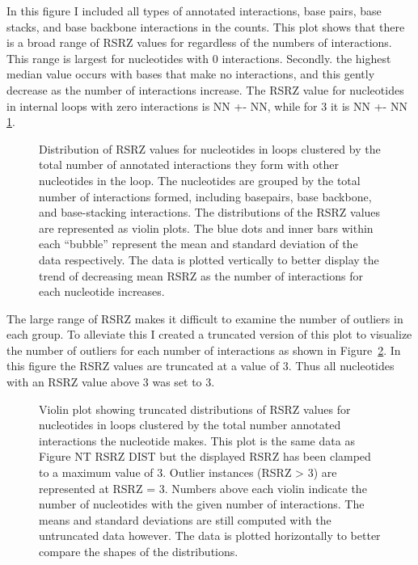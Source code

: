 In this figure I included all types of annotated interactions, base pairs, base
stacks, and base backbone interactions in the counts. This plot shows that there
is a broad range of RSRZ values for regardless of the numbers of interactions.
This range is largest for nucleotides with 0 interactions.  Secondly. the
highest median value occurs with bases that make no interactions, and this
gently decrease as the number of interactions increase. The RSRZ value for
nucleotides in internal loops with zero interactions is NN +- NN, while for 3 it
is NN +- NN \ref{tab:rsrz-means}.

\begin{figure}
  \caption{ Distribution of RSRZ values for nucleotides in loops clustered by
    the total number of annotated interactions they form with other nucleotides
    in the loop. The nucleotides are grouped by the total number of interactions
    formed, including basepairs, base backbone, and base-stacking interactions.
    The distributions of the RSRZ values are represented as violin plots. The
    blue dots and inner bars within each ``bubble'' represent the mean and
    standard deviation of the data respectively. The data is plotted vertically
    to better display the trend of decreasing mean RSRZ as the number of
  interactions for each nucleotide increases. }
  \label{tab:rsrz-means}
\end{figure}

The large range of RSRZ makes it difficult to examine the number of outliers in
each group. To alleviate this I created a truncated version of this plot to
visualize the number of outliers for each number of interactions as shown in
Figure~\ref{fig:truncated-rsrz-dist}. In this figure the RSRZ values are
truncated at a value of 3. Thus all nucleotides with an RSRZ value above 3 was
set to 3. 

\begin{figure}
  \caption{Violin plot showing truncated distributions of RSRZ values for
    nucleotides in loops clustered by the total number annotated interactions
    the nucleotide makes. This plot is the same data as Figure NT RSRZ DIST but
    the displayed RSRZ has been clamped to a maximum value of 3. Outlier
    instances (RSRZ > 3) are represented at RSRZ = 3. Numbers above each violin
    indicate the number of nucleotides with the given number of interactions.
    The means and standard deviations are still computed with the untruncated
    data however. The data is plotted horizontally to better compare the shapes
  of the distributions.}
  \label{fig:truncated-rsrz-dist}
\end{figure}

